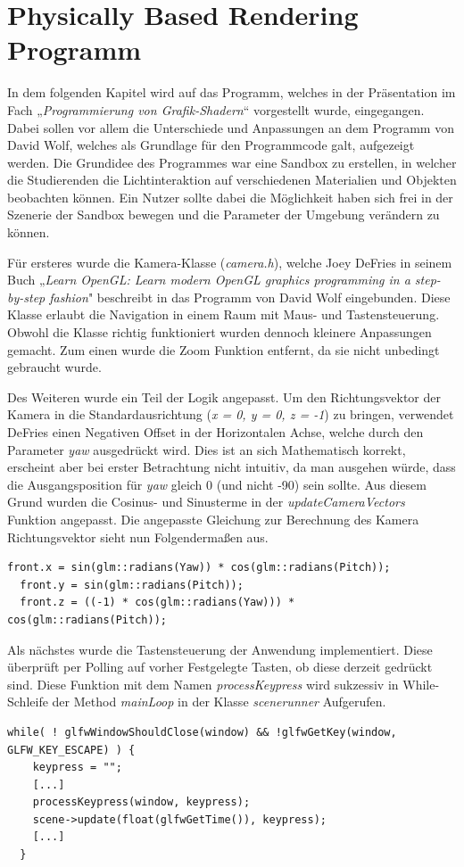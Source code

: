 \documentclass[
  11pt,
  a4paper,
  oneside
  ]{article}
\begin{document}
\section{Physically Based Rendering Programm}
In dem folgenden Kapitel wird auf das Programm, welches in der Präsentation im Fach „\textit{Programmierung von Grafik-Shadern}“ vorgestellt wurde, eingegangen. Dabei sollen vor allem die Unterschiede und Anpassungen an dem Programm von David Wolf, welches als Grundlage für den Programmcode galt, aufgezeigt werden. Die Grundidee des Programmes war eine Sandbox zu erstellen, in welcher die Studierenden die Lichtinteraktion auf verschiedenen Materialien und Objekten beobachten können. Ein Nutzer sollte dabei die Möglichkeit haben sich frei in der Szenerie der Sandbox bewegen und die Parameter der Umgebung verändern zu können.

Für ersteres wurde die Kamera-Klasse (\textit{camera.h}), welche Joey DeFries in seinem Buch „\textit{Learn OpenGL: Learn modern OpenGL graphics programming in a step-by-step fashion}"\cite{learnOpenGL} beschreibt in das Programm von David Wolf eingebunden. Diese Klasse erlaubt die Navigation in einem Raum mit Maus- und Tastensteuerung. Obwohl die Klasse richtig funktioniert wurden dennoch kleinere Anpassungen gemacht. Zum einen wurde die Zoom Funktion entfernt, da sie nicht unbedingt gebraucht wurde. 

Des Weiteren wurde ein Teil der Logik angepasst. Um den Richtungsvektor der Kamera in die Standardausrichtung (\textit{x = 0, y = 0, z = -1}) zu bringen, verwendet DeFries einen Negativen Offset in der Horizontalen Achse, welche durch den Parameter \textit{yaw} ausgedrückt wird. Dies ist an sich Mathematisch korrekt, erscheint aber bei erster Betrachtung nicht intuitiv, da man ausgehen würde, dass die Ausgangsposition für \textit{yaw} gleich 0 (und nicht -90) sein sollte. Aus diesem Grund wurden die Cosinus- und Sinusterme in der \textit{updateCameraVectors} Funktion angepasst. Die angepasste Gleichung zur Berechnung des Kamera Richtungsvektor sieht nun Folgendermaßen aus.
\begin{lstlisting}[caption={Ausschnitt der angepassten updateCameraVectors-Funktion von Joey DeFries}]
  front.x = sin(glm::radians(Yaw)) * cos(glm::radians(Pitch));
  front.y = sin(glm::radians(Pitch));
  front.z = ((-1) * cos(glm::radians(Yaw))) * cos(glm::radians(Pitch));
\end{lstlisting}\hfill

Als nächstes wurde die Tastensteuerung der Anwendung implementiert. Diese über\-prüft per Polling auf vorher Festgelegte Tasten, ob diese derzeit gedrückt sind. Diese Funktion mit dem Namen \textit{processKeypress} wird sukzessiv in While-Schleife der Method \textit{mainLoop} in der Klasse \textit{scenerunner} Aufgerufen.  
\begin{lstlisting}[tabsize=2, caption={Auszug der While-Schleife aus der Klasse Scenerunner}]
  while( ! glfwWindowShouldClose(window) && !glfwGetKey(window, GLFW_KEY_ESCAPE) ) {
    keypress = "";
    [...]
    processKeypress(window, keypress);
    scene->update(float(glfwGetTime()), keypress);
    [...]
  }
\end{lstlisting}
\end{document}
